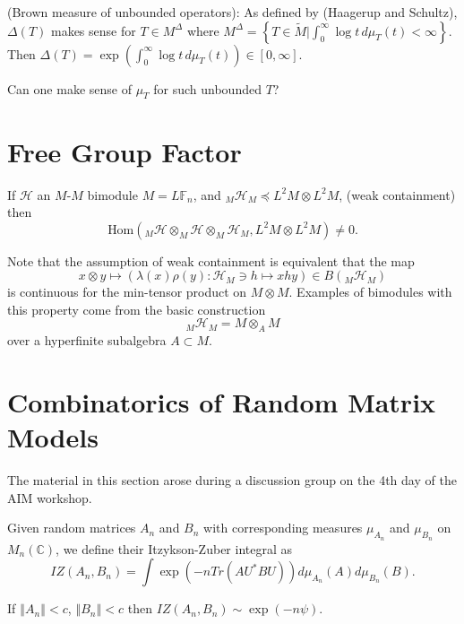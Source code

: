\documentclass[12pt,letterpaper, reqno]{amsart}
\begin{document}
\begin{problemblock}
(Brown measure of unbounded operators): As
defined by (Haagerup and Schultz), $\Delta(T)$   makes sense
for $T\in M^{\Delta}$ where $M^{\Delta}=\left\{ T\in\tilde{M}\vert\int_{0}^{\infty}\log t\, d\mu_{T}(t)<\infty\right\} $.
Then $\Delta(T)=\exp(\int_{0}^{\infty}\log t\, d\mu_{T}(t))\in[0,\infty]$.
\begin{problem}
Can one make sense of $\mu_{T}$ for such unbounded $T$?
\end{problem}
\end{problemblock}

\section{Free Group Factor}

\begin{problemblock}
\begin{conjecture}If $\mathcal{H}$ an $M\textrm{-}M$ bimodule
$M=L\mathbb{F}_{n}$, and $_{M}\mathcal{H}_{M}\preceq L^{2}M\otimes L^{2}M$,
(weak containment) then \[
\textrm{Hom}(_{M}\mathcal{H}\mathop{\otimes}_{M}\mathcal{H}\mathop{\otimes}_{M}\mathcal{H}_{M},L^{2}M\otimes L^{2}M)\neq0\textrm{.}\]
\end{conjecture}


Note that the assumption of weak containment is equivalent that the
map\[
x\otimes y\mapsto(\lambda(x)\rho(y):\mathcal{H}_{M}\ni h\mapsto xhy)\in B(_{M}\mathcal{H}_{M})\]
is continuous for the min-tensor product on $M\otimes M$. Examples
of bimodules with this property come from the basic construction\[
_{M}\mathcal{H}_{M}=M\otimes_{A}M\]
over a hyperfinite subalgebra $A\subset M$.

\end{problemblock}

\section{Combinatorics of Random Matrix Models}

The material in this section arose during a discussion group on
the 4th day of the AIM workshop.


Given random matrices $A_{n}$ and $B_{n}$ with corresponding measures
$\mu_{A_{n}}$ and $\mu_{B_{n}}$ on $M_{n}(\mathbb{C})$, we define
their Itzykson-Zuber integral as\[
IZ(A_{n},B_{n})=\int\exp(-nTr(AU^{*}BU))d\mu_{A_{n}}(A)d\mu_{B_{n}}(B)\textrm{.}\]
 \begin{theorem}  If $\left\Vert A_{n}\right\Vert <c$,
$\left\Vert B_{n}\right\Vert <c$ then $IZ(A_{n},B_{n})\sim\exp(-n\psi)$.
\end{theorem}
\end{document}
